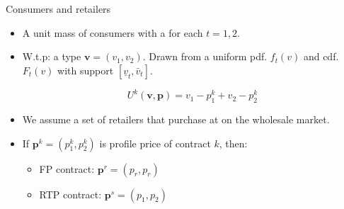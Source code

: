 \documentclass{class}
\begin{document}

\begin{frame}{Consumers and retailers}

\begin{itemize}
    \item A unit mass of consumers with a  for each $t = 1,2$. 

\vfill

    \item W.t.p: a  type $\textbf{v}=(v_1,v_2) $. Drawn from a uniform pdf. $f_t(v)$ and cdf. $F_t(v)$ with support $[\underline{v}_t,\bar{v}_t]$.  

        \vfill
        
\begin{equation*}
U^k\left(\textbf{v},\textbf{p}\right)= v_1-p^k_1 +  v_2-p^k_2
\end{equation*}    

     \vfill

\item We assume a set of retailers that purchase at  on the wholesale market.  \vfill

\item If $\textbf{p}^k=(p_1^k,p_2^k)$ is profile price of contract $k$, then:  \vfill

    \begin{itemize}
        \item FP contract: $\textbf{p}^{r} =  (p_r,p_r)$ \vfill
        \item RTP contract: $\textbf{p}^{s} =  (p_1,p_2)$
    \end{itemize}
    
\end{itemize}    
\end{frame}

\end{document}
